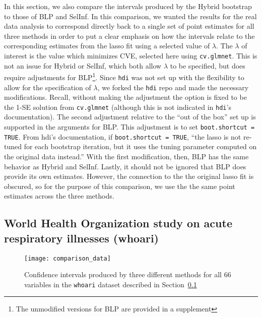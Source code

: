 In this section, we also compare the intervals produced by the Hybrid bootstrap to those of BLP and SelInf. In this comparison, we wanted the results for the real data analysis to correspond directly back to a single set of point estimates for all three methods in order to put a clear emphasis on how the intervals relate to the corresponding estimates from the lasso fit using a selected value of $\lambda$. The $\lambda$ of interest is the value which minimizes CVE, selected here using \texttt{cv.glmnet}. This is not an issue for Hybrid or SelInf, which both allow $\lambda$ to be specified, but does require adjustments for BLP\footnote{The unmodified versions for BLP are provided in a supplement}. Since \texttt{hdi} was not set up with the flexibility to allow for the specification of $\lambda$, we forked the \texttt{hdi} repo and made the necessary modifications. Recall, without making the adjustment the option is fixed to be the 1-SE solution from \texttt{cv.glmnet} (although this is not indicated in \texttt{hdi}'s documentation). The second adjustment relative to the ``out of the box'' set up is supported in the arguments for BLP. This adjustment is to set \texttt{boot.shortcut = TRUE}. From hdi's documentation, if \texttt{boot.shortcut = TRUE}, ``the lasso is not re-tuned for each bootstrap iteration, but it uses the tuning parameter computed on the original data instead.'' With the first modification, then, BLP has the same behavior as Hybrid and SelInf. Lastly, it should not be ignored that BLP does provide its own estimates. However, the connection to the the original lasso fit is obscured, so for the purpose of this comparison, we use the the same point estimates across the three methods.

\subsection{World Health Organization study on acute respiratory illnesses (whoari)}\label{Sec:whoari}

\begin{figure}[hbtp]
  \begin{center}
  \texttt{[image: comparison\_data]}
  \caption{\label{Fig:comparison_data_whoari} Confidence intervals produced by three different methods for all 66 variables in the \texttt{whoari} dataset described in Section~\ref{Sec:whoari}}
  \end{center}
\end{figure}

